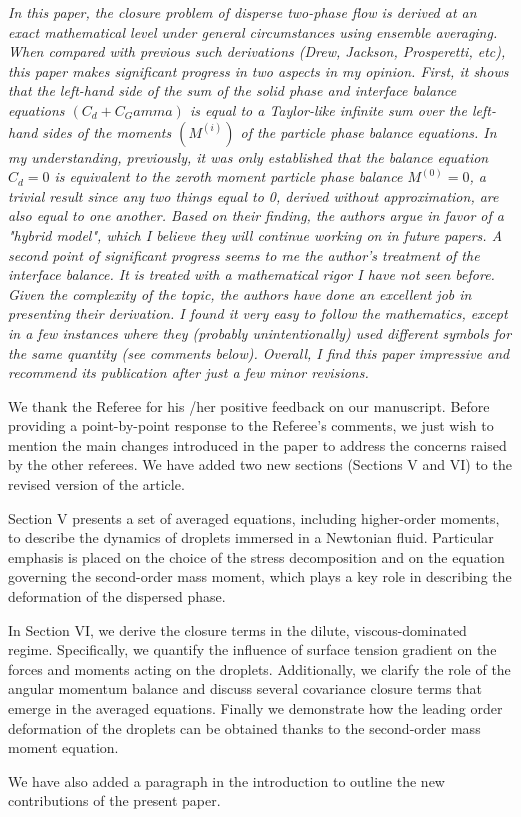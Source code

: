 \documentclass[10pt,a4paper]{article}
\newcommand{\tb}[1]{\color{blue}#1\color{black}}
\begin{document}
\textit{In this paper, the closure problem of disperse two-phase flow is derived at an exact mathematical level under general circumstances using ensemble averaging. When compared with previous such derivations (Drew, Jackson, Prosperetti, etc), this paper makes significant progress in two aspects in my opinion. First, it shows that the left-hand side of the sum of the solid phase and interface balance equations $(C_d+C_Gamma)$ is equal to a Taylor-like infinite sum over the left-hand sides of the moments $(M^(i))$ of the particle phase balance equations. In my understanding, previously, it was only established that the balance equation $C_d =0$ is equivalent to the zeroth moment particle phase balance $M^(0)=0$, a trivial result since any two things equal to 0, derived without approximation, are also equal to one another. Based on their finding, the authors argue in favor of a "hybrid model", which I believe they will continue working on in future papers. A second point of significant progress seems to me the author's treatment of the interface balance. It is treated with a mathematical rigor I have not seen before.
Given the complexity of the topic, the authors have done an excellent job in presenting their derivation. I found it very easy to follow the mathematics, except in a few instances where they (probably unintentionally) used different symbols for the same quantity (see comments below). Overall, I find this paper impressive and recommend its publication after just a few minor revisions.}

\tb{
We thank the Referee for his /her positive feedback on our manuscript. 
Before providing a point-by-point response to the Referee’s comments, we just wish to mention the main changes introduced in the paper to address the concerns raised by the other referees.
We have added two new sections (Sections V and VI) to the revised version of the article.

Section V presents a set of averaged equations, including higher-order moments, to describe the dynamics of droplets immersed in a Newtonian fluid. 
Particular emphasis is placed on the choice of the stress decomposition and on the equation governing the second-order mass moment, which plays a key role in describing the deformation of the dispersed phase.

In Section VI, we derive the closure terms in the dilute, viscous-dominated regime. 
Specifically, we quantify the influence of surface tension gradient on the forces and moments acting on the droplets. 
Additionally, we clarify the role of the angular momentum balance and discuss several covariance closure terms that emerge in the averaged equations.
Finally we demonstrate how the leading order deformation of the droplets can be obtained thanks to the second-order mass moment equation.

We have also added a paragraph in the introduction to outline the new contributions of the present paper.

}
\end{document}
